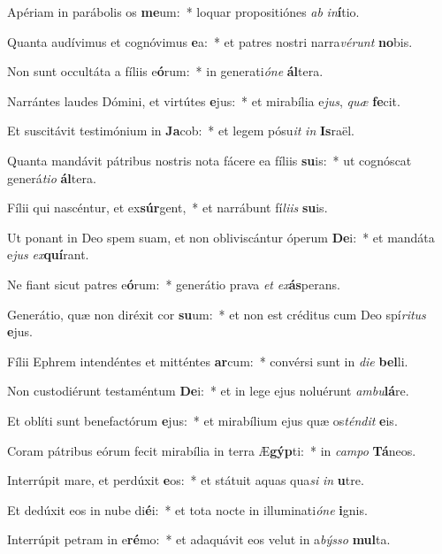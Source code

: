 \item Apériam in parábolis os \textbf{me}um:~* loquar propositiónes \textit{ab} \textit{in}\textbf{í}tio.
\item Quanta audívimus et cognóvimus \textbf{e}a:~* et patres nostri narra\textit{vé}\textit{runt} \textbf{no}bis.
\item Non sunt occultáta a fíliis e\textbf{ó}rum:~* in generati\textit{ó}\textit{ne} \textbf{ál}tera.
\item Narrántes laudes Dómini, et virtútes \textbf{e}jus:~* et mirabília e\textit{jus}, \textit{quæ} \textbf{fe}cit.
\item Et suscitávit testimónium in \textbf{Ja}cob:~* et legem pósu\textit{it} \textit{in} \textbf{Is}raël.
\item Quanta mandávit pátribus nostris nota fácere ea fíliis \textbf{su}is:~* ut cognóscat generá\textit{ti}\textit{o} \textbf{ál}tera.
\item Fílii qui nascéntur, et ex\textbf{súr}gent,~* et narrábunt fí\textit{li}\textit{is} \textbf{su}is.
\item Ut ponant in Deo spem suam, et non obliviscántur óperum \textbf{De}i:~* et mandáta e\textit{jus} \textit{ex}\textbf{quí}rant.
\item Ne fiant sicut patres e\textbf{ó}rum:~* generátio prava \textit{et} \textit{ex}\textbf{ás}perans.
\item Generátio, quæ non diréxit cor \textbf{su}um:~* et non est créditus cum Deo spí\textit{ri}\textit{tus} \textbf{e}jus.
\item Fílii Ephrem intendéntes et mitténtes \textbf{ar}cum:~* convérsi sunt in \textit{di}\textit{e} \textbf{bel}li.
\item Non custodiérunt testaméntum \textbf{De}i:~* et in lege ejus noluérunt \textit{am}\textit{bu}\textbf{lá}re.
\item Et oblíti sunt benefactórum \textbf{e}jus:~* et mirabílium ejus quæ os\textit{tén}\textit{dit} \textbf{e}is.
\item Coram pátribus eórum fecit mirabília in terra Æ\textbf{gýp}ti:~* in \textit{cam}\textit{po} \textbf{Tá}neos.
\item Interrúpit mare, et perdúxit \textbf{e}os:~* et státuit aquas qua\textit{si} \textit{in} \textbf{u}tre.
\item Et dedúxit eos in nube di\textbf{é}i:~* et tota nocte in illuminati\textit{ó}\textit{ne} \textbf{i}gnis.
\item Interrúpit petram in e\textbf{ré}mo:~* et adaquávit eos velut in a\textit{býs}\textit{so} \textbf{mul}ta.

